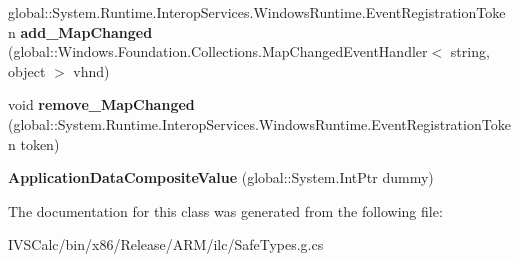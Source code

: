 \begin{DoxyCompactItemize}
\item 
\mbox{\label{class_windows_1_1_storage_1_1_application_data_composite_value_a1c91f78248cdfefd48dbb74e8c6cbcae}} 
global\+::\+System.\+Runtime.\+Interop\+Services.\+Windows\+Runtime.\+Event\+Registration\+Token {\bfseries add\+\_\+\+Map\+Changed} (global\+::\+Windows.\+Foundation.\+Collections.\+Map\+Changed\+Event\+Handler$<$ string, object $>$ vhnd)
\item 
\mbox{\label{class_windows_1_1_storage_1_1_application_data_composite_value_a38756e63852d3bb4fa2a5e28b2db18be}} 
void {\bfseries remove\+\_\+\+Map\+Changed} (global\+::\+System.\+Runtime.\+Interop\+Services.\+Windows\+Runtime.\+Event\+Registration\+Token token)
\item 
\mbox{\label{class_windows_1_1_storage_1_1_application_data_composite_value_a687a19ee159649de2153e9c15280a883}} 
{\bfseries Application\+Data\+Composite\+Value} (global\+::\+System.\+Int\+Ptr dummy)
\end{DoxyCompactItemize}


The documentation for this class was generated from the following file\+:\begin{DoxyCompactItemize}
\item 
I\+V\+S\+Calc/bin/x86/\+Release/\+A\+R\+M/ilc/Safe\+Types.\+g.\+cs\end{DoxyCompactItemize}
